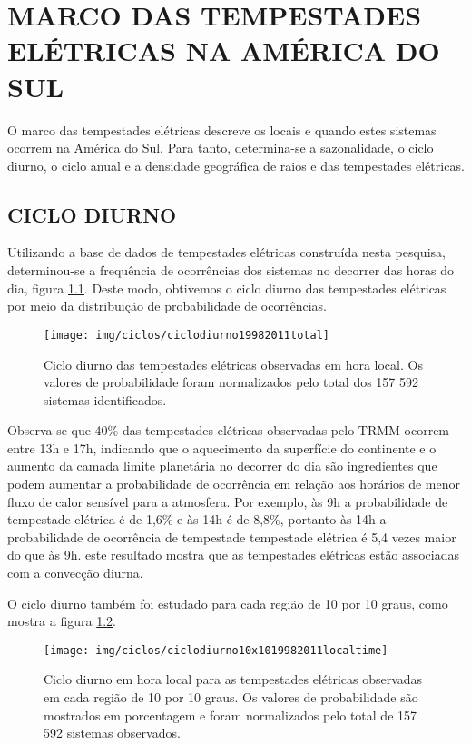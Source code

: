 \chapter{MARCO DAS TEMPESTADES ELÉTRICAS NA AMÉRICA DO SUL}

O marco das tempestades elétricas descreve os locais e quando estes sistemas ocorrem na América do Sul. Para tanto, determina-se a sazonalidade, o ciclo diurno, o ciclo anual e a densidade geográfica de raios e das tempestades elétricas.

\section{CICLO DIURNO}

Utilizando a base de dados de tempestades elétricas construída nesta pesquisa, determinou-se a frequência de ocorrências dos sistemas no decorrer das horas do dia, figura \ref{ciclodiurnototal}. Deste modo, obtivemos o ciclo diurno das tempestades elétricas por meio da distribuição de probabilidade de ocorrências.

\begin{figure}[!hb]
  \centering
  {{\texttt{[image: img/ciclos/ciclodiurno19982011total]}}}
\caption{Ciclo diurno das tempestades elétricas observadas em hora local. Os valores de probabilidade foram normalizados pelo total dos {157 592} sistemas identificados.}
\label{ciclodiurnototal}
\end{figure} 

Observa-se que 40\%  das tempestades elétricas observadas pelo TRMM ocorrem entre 13h e 17h, indicando que o aquecimento da superfície do continente e o aumento da camada limite planetária no decorrer do dia são ingredientes que podem aumentar a probabilidade de ocorrência em  relação aos horários de menor fluxo de calor sensível para a atmosfera. Por exemplo, às 9h a probabilidade de tempestade elétrica é de 1,6\% e às 14h é de 8,8\%, portanto às 14h a probabilidade de ocorrência de tempestade tempestade elétrica é 5,4 vezes maior do que às 9h. este resultado mostra que as tempestades elétricas estão associadas com a convecção diurna.


O ciclo diurno também foi estudado para cada região de 10 por 10 graus, como mostra a figura \ref{diurno}. 

\begin{figure}[!hb]
\centering
{\texttt{[image: img/ciclos/ciclodiurno10x1019982011localtime]}}  
\caption{Ciclo diurno em hora local para as tempestades elétricas observadas em cada região de 10 por 10 graus. Os valores de probabilidade são mostrados em porcentagem e foram normalizados pelo total de {157 592} sistemas observados.}
\label{diurno}
\end{figure}


